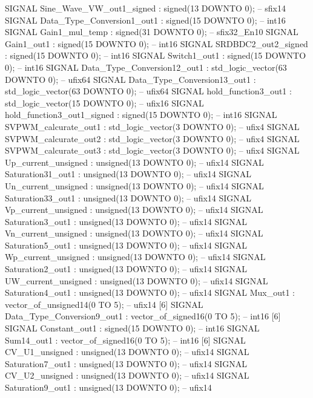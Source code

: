 \begin{mylisting}[language=VHDL,caption=MSSRDCDB制御\&SVPWMモジュール,label=appF_Control_top2_module_VHDL]
  SIGNAL Sine_Wave_VW_out1_signed         : signed(13 DOWNTO 0);  -- sfix14
  SIGNAL Data_Type_Conversion1_out1       : signed(15 DOWNTO 0);  -- int16
  SIGNAL Gain1_mul_temp                   : signed(31 DOWNTO 0);  -- sfix32_En10
  SIGNAL Gain1_out1                       : signed(15 DOWNTO 0);  -- int16
  SIGNAL SRDBDC2_out2_signed              : signed(15 DOWNTO 0);  -- int16
  SIGNAL Switch1_out1                     : signed(15 DOWNTO 0);  -- int16
  SIGNAL Data_Type_Conversion12_out1      : std_logic_vector(63 DOWNTO 0);  -- ufix64
  SIGNAL Data_Type_Conversion13_out1      : std_logic_vector(63 DOWNTO 0);  -- ufix64
  SIGNAL hold_function3_out1              : std_logic_vector(15 DOWNTO 0);  -- ufix16
  SIGNAL hold_function3_out1_signed       : signed(15 DOWNTO 0);  -- int16
  SIGNAL SVPWM_calcurate_out1             : std_logic_vector(3 DOWNTO 0);  -- ufix4
  SIGNAL SVPWM_calcurate_out2             : std_logic_vector(3 DOWNTO 0);  -- ufix4
  SIGNAL SVPWM_calcurate_out3             : std_logic_vector(3 DOWNTO 0);  -- ufix4
  SIGNAL Up_current_unsigned              : unsigned(13 DOWNTO 0);  -- ufix14
  SIGNAL Saturation31_out1                : unsigned(13 DOWNTO 0);  -- ufix14
  SIGNAL Un_current_unsigned              : unsigned(13 DOWNTO 0);  -- ufix14
  SIGNAL Saturation33_out1                : unsigned(13 DOWNTO 0);  -- ufix14
  SIGNAL Vp_current_unsigned              : unsigned(13 DOWNTO 0);  -- ufix14
  SIGNAL Saturation3_out1                 : unsigned(13 DOWNTO 0);  -- ufix14
  SIGNAL Vn_current_unsigned              : unsigned(13 DOWNTO 0);  -- ufix14
  SIGNAL Saturation5_out1                 : unsigned(13 DOWNTO 0);  -- ufix14
  SIGNAL Wp_current_unsigned              : unsigned(13 DOWNTO 0);  -- ufix14
  SIGNAL Saturation2_out1                 : unsigned(13 DOWNTO 0);  -- ufix14
  SIGNAL UW_current_unsigned              : unsigned(13 DOWNTO 0);  -- ufix14
  SIGNAL Saturation4_out1                 : unsigned(13 DOWNTO 0);  -- ufix14
  SIGNAL Mux_out1                         : vector_of_unsigned14(0 TO 5);  -- ufix14 [6]
  SIGNAL Data_Type_Conversion9_out1       : vector_of_signed16(0 TO 5);  -- int16 [6]
  SIGNAL Constant_out1                    : signed(15 DOWNTO 0);  -- int16
  SIGNAL Sum14_out1                       : vector_of_signed16(0 TO 5);  -- int16 [6]
  SIGNAL CV_U1_unsigned                   : unsigned(13 DOWNTO 0);  -- ufix14
  SIGNAL Saturation7_out1                 : unsigned(13 DOWNTO 0);  -- ufix14
  SIGNAL CV_U2_unsigned                   : unsigned(13 DOWNTO 0);  -- ufix14
  SIGNAL Saturation9_out1                 : unsigned(13 DOWNTO 0);  -- ufix14

\end{mylisting}
